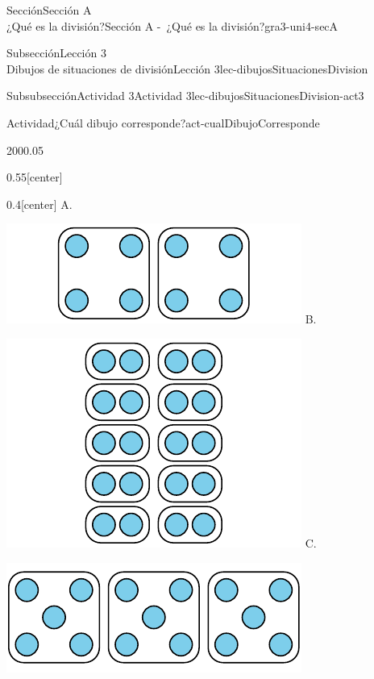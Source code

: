 \begin{sectionptx}{Sección}{{\Large Sección A\\}¿Qué es la división?}{}{Sección A -~¿Qué es la división?}{}{}{gra3-uni4-secA}
\begin{subsectionptx}{Subsección}{{\normalsize Lección 3\\[-0.05cm]}Dibujos de situaciones de división}{}{Lección 3}{}{}{lec-dibujosSituacionesDivision}
\begin{subsubsectionptx}{Subsubsección}{Actividad 3}{}{Actividad 3}{}{}{lec-dibujosSituacionesDivision-act3}
\begin{activity}{Actividad}{¿Cuál dibujo corresponde?}{act-cualDibujoCorresponde}
\begin{sidebyside}{2}{0}{0}{0.05}
\begin{sbspanel}{0.55}[center]
\begin{enumerate}
\end{enumerate}
\end{sbspanel}%
\begin{sbspanel}{0.4}[center]%
A.%
\par
\includegraphics[max width=\linewidth, center]{external/svg-source/tikz-file-149313.pdf}
B.%
\par
\includegraphics[max width=\linewidth, center]{external/svg-source/tikz-file-149314.pdf}
C.%
\par
\includegraphics[max width=\linewidth, center]{external/svg-source/tikz-file-149315.pdf}
\end{sbspanel}%
\end{sidebyside}%
\end{activity}%

\end{subsubsectionptx}
\end{subsectionptx}
\end{sectionptx}
